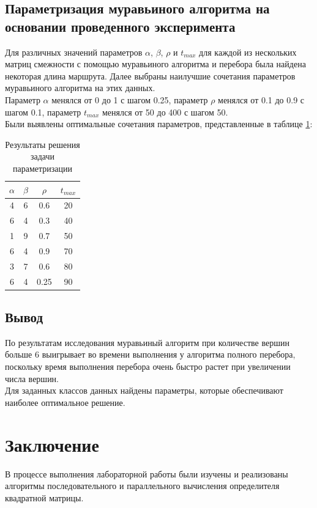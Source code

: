 \documentclass[a4paper,oneside,14pt]{extreport}
\begin{document}
\section{Параметризация муравьиного алгоритма на основании проведенного эксперимента}	

Для различных значений параметров $\alpha$, $\beta$, $\rho$ и $t_{max}$ для каждой из нескольких матриц смежности с помощью муравьиного алгоритма и перебора была найдена некоторая длина маршрута. Далее выбраны наилучшие сочетания параметров муравьиного алгоритма на этих данных.\\
Параметр $\alpha$ менялся от 0 до 1 с шагом 0.25, параметр $\rho$ менялся от 0.1 до 0.9 с шагом 0.1, параметр $t_{max}$ менялся от 50 до 400 с шагом 50.\\
Были выявлены оптимальные сочетания параметров, представленные в таблице \ref{tab1}:\\

\begin{table}[H]
	\caption{Результаты решения задачи параметризации}
	\label{tab1}
	\begin{center}
		
		\begin{tabular}{|c|c|c|c|}
			\hline
			$\alpha$ &$\beta$ & $\rho$ & $t_{max}$ \\\hline
			4&6&0.6&20\\
			6&4&0.3&40\\
			1&9&0.7&50\\
			6&4&0.9&70\\
			3&7&0.6&80\\
			6&4&0.25&90\\
			\hline
		\end{tabular}
	\end{center}
\end{table} 

\section*{Вывод}
По результатам исследования муравьиный алгоритм при количестве вершин больше 6 выигрывает во времени выполнения у алгоритма полного перебора, поскольку время выполнения перебора очень быстро растет при увеличении числа вершин.\\

Для заданных классов данных найдены параметры, которые обеспечивают наиболее оптимальное решение.
\newpage

\chapter*{Заключение}
В процессе выполнения лабораторной работы были изучены и реализованы алгоритмы последовательного и параллельного вычисления определителя квадратной матрицы.
\end{document}
